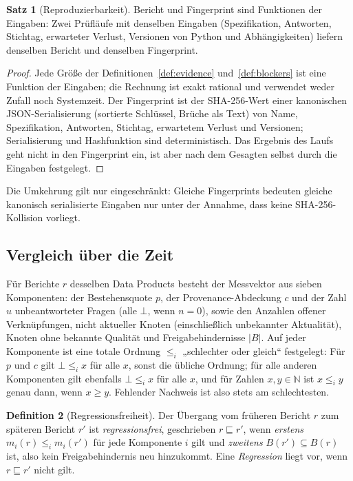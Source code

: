 \documentclass[a4paper,12pt]{article}
\theoremstyle{definition}
\newtheorem{definition}{Definition}[section]
\newtheorem{satz}[definition]{Satz}
\newcommand{\NN}{\mathbb{N}}
\begin{document}
\begin{satz}[Reproduzierbarkeit]\label{thm:repro}
Bericht und Fingerprint sind Funktionen der Eingaben: Zwei Prüfläufe mit denselben Eingaben (Spezifikation, Antworten, Stichtag, erwarteter Verlust, Versionen von Python und Abhängigkeiten) liefern denselben Bericht und denselben Fingerprint.
\end{satz}
\begin{proof}
Jede Größe der Definitionen~\ref{def:evidence} und~\ref{def:blockers} ist eine Funktion der Eingaben; die Rechnung ist exakt rational und verwendet weder Zufall noch Systemzeit. Der Fingerprint ist der SHA-256-Wert einer kanonischen JSON-Serialisierung (sortierte Schlüssel, Brüche als Text) von Name, Spezifikation, Antworten, Stichtag, erwartetem Verlust und Versionen; Serialisierung und Hashfunktion sind deterministisch. Das Ergebnis des Laufs geht nicht in den Fingerprint ein, ist aber nach dem Gesagten selbst durch die Eingaben festgelegt.
\end{proof}

Die Umkehrung gilt nur eingeschränkt: Gleiche Fingerprints bedeuten gleiche kanonisch serialisierte Eingaben nur unter der Annahme, dass keine SHA-256-Kollision vorliegt.

\subsection{Vergleich über die Zeit}

Für Berichte $r$ desselben Data Products besteht der Messvektor aus sieben Komponenten: der Bestehensquote $p$, der Provenance-Abdeckung $c$ und der Zahl $u$ unbeantworteter Fragen (alle $\bot$, wenn $n=0$), sowie den Anzahlen offener Verknüpfungen, nicht aktueller Knoten (einschließlich unbekannter Aktualität), Knoten ohne bekannte Qualität und Freigabehindernisse $|B|$. Auf jeder Komponente ist eine totale Ordnung $\le_i$ „schlechter oder gleich“ festgelegt: Für $p$ und $c$ gilt $\bot\le_i x$ für alle $x$, sonst die übliche Ordnung; für alle anderen Komponenten gilt ebenfalls $\bot\le_i x$ für alle $x$, und für Zahlen $x,y\in\NN$ ist $x\le_i y$ genau dann, wenn $x\ge y$. Fehlender Nachweis ist also stets am schlechtesten.

\begin{definition}[Regressionsfreiheit]\label{def:regression}
Der Übergang vom früheren Bericht $r$ zum späteren Bericht $r'$ ist \emph{regressionsfrei}, geschrieben $r\sqsubseteq r'$, wenn \emph{erstens} $m_i(r)\le_i m_i(r')$ für jede Komponente $i$ gilt und \emph{zweitens} $B(r')\subseteq B(r)$ ist, also kein Freigabehindernis neu hinzukommt. Eine \emph{Regression} liegt vor, wenn $r\sqsubseteq r'$ nicht gilt.
\end{definition}
\end{document}
